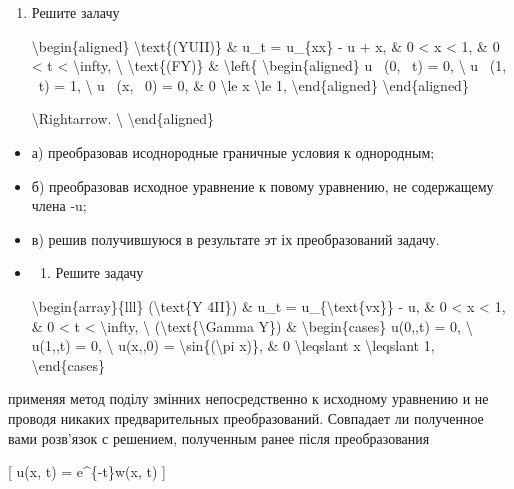 \documentclass[
]{article}
\providecommand{\tightlist}{%
  \setlength{\itemsep}{0pt}\setlength{\parskip}{0pt}}
\begin{document}
\begin{enumerate}
\def\labelenumi{\arabic{enumi}.}
\setcounter{enumi}{1}
\item
  Решите залачу

  \textbackslash begin\{aligned\} \textbackslash text\{(YUII)\} \& u\_t
  = u\_\{xx\} - u + x, \& 0 \textless{} x \textless{} 1, \& 0
  \textless{} t \textless{} \textbackslash infty, \textbackslash{}
  \textbackslash text\{(FY)\} \& \textbackslash left\{
  \textbackslash begin\{aligned\} u ~(0, ~t) = 0, \textbackslash{} u
  ~(1, ~t) = 1, \textbackslash{} u ~(x, ~0) = 0, \& 0 \textbackslash le
  x \textbackslash le 1, \textbackslash end\{aligned\}
  \textbackslash end\{aligned\}

  \textbackslash Rightarrow. \textbackslash{}
  \textbackslash end\{aligned\}
\end{enumerate}

\begin{itemize}
\item
  а) преобразовав исоднородные граничные условия к однородным;
\item
  б) преобразовав исходное уравнение к повому уравнению, не содержащему
  члена -u;
\item
  в) решив получившуюся в результате эт іх преобразований задачу.
\item
  \begin{enumerate}
  \def\labelenumi{\arabic{enumi}.}
  \setcounter{enumi}{2}
  \tightlist
  \item
    Решите задачу
  \end{enumerate}

  \textbackslash begin\{array\}\{lll\} (\textbackslash text\{Y 4II\}) \&
  u\_t = u\_\{\textbackslash text\{vx\}\} - u, \& 0 \textless{} x
  \textless{} 1, \& 0 \textless{} t \textless{} \textbackslash infty,
  \textbackslash{} (\textbackslash text\{\textbackslash Gamma Y\}) \&
  \textbackslash begin\{cases\} u(0,,t) = 0, \textbackslash{} u(1,,t) =
  0, \textbackslash{} u(x,,0) = \textbackslash sin\{(\textbackslash pi
  x)\}, \& 0 \textbackslash leqslant x \textbackslash leqslant 1,
  \textbackslash end\{cases\}
\end{itemize}

применяя метод поділу змінних непосредственно к исходному уравнению и не
проводя никаких предварительных преобразований. Совпадает ли полученное
вами розв'язок с решением, полученным ранее після преобразования

{[} u(x, t) = e\^{}\{-t\}w(x, t) {]}
\end{document}
